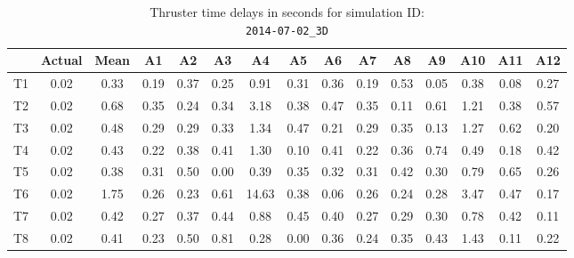\begin{table}[H]
\centering
\cprotect\caption{Thruster time delays in seconds for simulation ID:\\
\verb|2014-07-02_3D|}
\begin{tabular}{|c|c|c|c|c|c|c|c|c|c|c|c|c|c|c|} \hline
~ & Actual & Mean & A1 & A2 & A3 & A4 & A5 & A6 & A7 & A8 & A9 & A10 & A11 & A12 \\ \hline
T1 & 0.02 & 0.33 & 0.19 & 0.37 & 0.25 & 0.91 & 0.31 & 0.36 & 0.19 & 0.53 & 0.05 & 0.38 & 0.08 & 0.27 \\
T2 & 0.02 & 0.68 & 0.35 & 0.24 & 0.34 & 3.18 & 0.38 & 0.47 & 0.35 & 0.11 & 0.61 & 1.21 & 0.38 & 0.57 \\
T3 & 0.02 & 0.48 & 0.29 & 0.29 & 0.33 & 1.34 & 0.47 & 0.21 & 0.29 & 0.35 & 0.13 & 1.27 & 0.62 & 0.20 \\
T4 & 0.02 & 0.43 & 0.22 & 0.38 & 0.41 & 1.30 & 0.10 & 0.41 & 0.22 & 0.36 & 0.74 & 0.49 & 0.18 & 0.42 \\
T5 & 0.02 & 0.38 & 0.31 & 0.50 & 0.00 & 0.39 & 0.35 & 0.32 & 0.31 & 0.42 & 0.30 & 0.79 & 0.65 & 0.26 \\
T6 & 0.02 & 1.75 & 0.26 & 0.23 & 0.61 & 14.63 & 0.38 & 0.06 & 0.26 & 0.24 & 0.28 & 3.47 & 0.47 & 0.17 \\
T7 & 0.02 & 0.42 & 0.27 & 0.37 & 0.44 & 0.88 & 0.45 & 0.40 & 0.27 & 0.29 & 0.30 & 0.78 & 0.42 & 0.11 \\
T8 & 0.02 & 0.41 & 0.23 & 0.50 & 0.81 & 0.28 & 0.00 & 0.36 & 0.24 & 0.35 & 0.43 & 1.43 & 0.11 & 0.22 \\ \hline
\end{tabular}
\label{delay-5}
\end{table}

